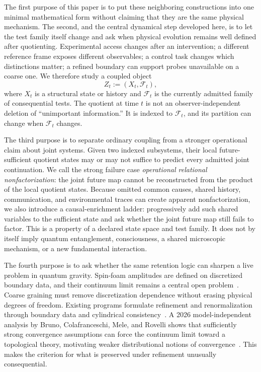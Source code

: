\documentclass[11pt]{article}
\newcommand{\F}{\mathcal F}
\begin{document}
The first purpose of this paper is to put these neighboring constructions into one minimal mathematical form without claiming that they are the same physical mechanism. The second, and the central dynamical step developed here, is to let the test family itself change and ask when physical evolution remains well defined after quotienting. Experimental access changes after an intervention; a different reference frame exposes different observables; a control task changes which distinctions matter; a refined boundary can support probes unavailable on a coarse one. We therefore study a coupled object
\begin{equation}
  Z_t := (X_t,\F_t),
  \label{eq:coupled-object}
\end{equation}
where $X_t$ is a structural state or history and $\F_t$ is the currently admitted family of consequential tests. The quotient at time $t$ is not an observer-independent deletion of ``unimportant information.'' It is indexed to $\F_t$, and its partition can change when $\F_t$ changes.

The third purpose is to separate ordinary coupling from a stronger operational claim about joint systems. Given two indexed subsystems, their local future-sufficient quotient states may or may not suffice to predict every admitted joint continuation. We call the strong failure case \emph{operational relational nonfactorization}: the joint future map cannot be reconstructed from the product of the local quotient states. Because omitted common causes, shared history, communication, and environmental traces can create apparent nonfactorization, we also introduce a causal-enrichment ladder: progressively add such shared variables to the sufficient state and ask whether the joint future map still fails to factor. This is a property of a declared state space and test family. It does not by itself imply quantum entanglement, consciousness, a shared microscopic mechanism, or a new fundamental interaction.

The fourth purpose is to ask whether the same retention logic can sharpen a live problem in quantum gravity. Spin-foam amplitudes are defined on discretized boundary data, and their continuum limit remains a central open problem~\cite{perez2013,steinhaus2020,bruno2026}. Coarse graining must remove discretization dependence without erasing physical degrees of freedom. Existing programs formulate refinement and renormalization through boundary data and cylindrical consistency~\cite{dittrich2012,dittrichsteinhaus2014}. A 2026 model-independent analysis by Bruno, Colafranceschi, Mele, and Rovelli shows that sufficiently strong convergence assumptions can force the continuum limit toward a topological theory, motivating weaker distributional notions of convergence~\cite{bruno2026}. This makes the criterion for what is preserved under refinement unusually consequential.
\end{document}
